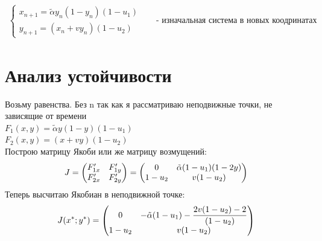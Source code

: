 \documentclass[fleqn]{article}
\begin{document}
\[
\boxed{
\begin{aligned}
\begin{cases}
x_{n+1} =\tilde{\alpha}y_n (1- y_n)(1-u_1) \\
y_{n+1} = (x_n + vy_n)(1-u_2)
\end{cases}
\end{aligned}
}
\quad \text{ - изначальная система в новых коодринатах}
\]


\section{Анализ устойчивости}

 Возьму равенства. Без n так как я рассматриваю неподвижные точки, не зависящие от времени \\
$ F_1(x,y) =\tilde{\alpha}y (1- y)(1-u_1) $ \\
$ F_2(x,y) = (x + vy)(1-u_2) $ \\
Построю матрицу Якоби или же матрицу возмущений:
 $$ J = \begin{pmatrix} 
    F'_{1x} & F'_{1y} \\ 
    F'_{2x} & F'_{2y}
 \end{pmatrix} = 
 \begin{pmatrix} 
    0 & \tilde{\alpha} (1-u_1)(1-2y) \\ 
    1-u_2 & v(1-u_2)
 \end{pmatrix}
 \\$$
Теперь высчитаю Якобиан в неподвижной точке:
 $$ J(x^*;y^*) =
 \begin{pmatrix} 
    0 & -\tilde{\alpha}(1-u_1) - \dfrac{2v(1-u_2) - 2}{(1-u_2)} \\ 
    1-u_2 & v(1-u_2)
 \end{pmatrix}
 \\$$
\end{document}
